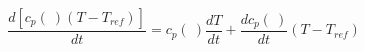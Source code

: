\begin{equation}
\frac{d [c_p(\ ) (T-T_{ref})]}{dt} =c_p(\ ) \frac{d T}{dt} + \frac{d c_p(\ )}{dt} (T- T_{ref})
\end{equation}